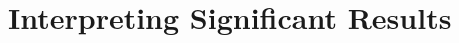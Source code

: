 \documentclass[9pt,twocolumn,twoside]{gsag3jnl}
\begin{document}
\section{Interpreting Significant Results}










\end{document}
